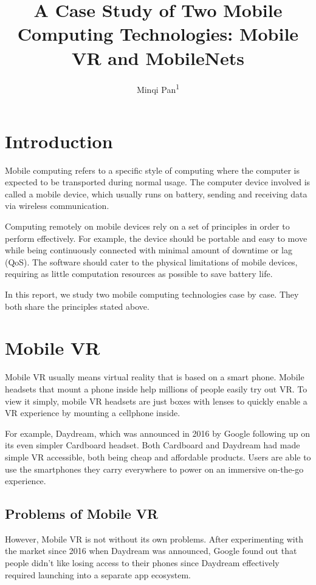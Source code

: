 \documentclass[11pt]{amsart}
\title{A Case Study of Two Mobile Computing Technologies: Mobile VR and MobileNets}
\author{Minqi Pan\textsuperscript{1}}
\begin{document}
\maketitle


\section{Introduction}
Mobile computing refers to a specific style of computing where the computer is expected to be transported during normal usage. The computer device involved is called a mobile device, which usually runs on battery, sending and receiving data via wireless communication. 

Computing remotely on mobile devices rely on a set of principles in order to perform effectively. For example, the device should be portable and easy to move while being continuously connected with minimal amount of downtime or lag (QoS). The software should cater to the physical limitations of mobile devices, requiring as little computation resources as possible to save battery life.

In this report, we study two mobile computing technologies case by case. They both share the principles stated above.

\section{Mobile VR}
Mobile VR usually means virtual reality that is based on a smart phone. Mobile headsets that mount a phone inside help millions of people easily try out VR. To view it simply, mobile VR headsets are just boxes with lenses to quickly enable a VR experience by mounting a cellphone inside.

For example, Daydream, which was announced in 2016 by Google following up on its even simpler Cardboard headset. Both Cardboard and Daydream had made simple VR accessible, both being cheap and affordable products. Users are able to use the smartphones they carry everywhere to power on an immersive on-the-go experience.

\subsection{Problems of Mobile VR}
However, Mobile VR is not without its own problems. After experimenting with the market since 2016 when Daydream was announced, Google found out that people didn't like losing access to their phones since Daydream effectively required launching into a separate app ecosystem.
\end{document}
